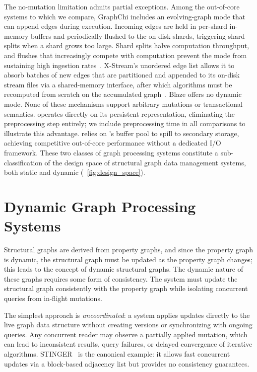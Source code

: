 The no-mutation limitation admits partial exceptions.
Among the out-of-core systems to which we compare, GraphChi includes an evolving-graph mode that can append edges during execution.
Incoming edges are held in per-shard in-memory buffers and periodically flushed to the on-disk shards, triggering shard splits when a shard grows too large.
Shard splits halve computation throughput, and flushes that increasingly compete with computation prevent the mode from sustaining high ingestion rates~\cite{kyrola2012graphchi}.
X-Stream's unordered edge list allows it to absorb batches of new edges that are partitioned and appended to its on-disk stream files via a shared-memory interface, after which algorithms must be recomputed from scratch on the accumulated graph~\cite{roy2013x}.
Blaze offers no dynamic mode.
None of these mechanisms support arbitrary mutations or transactional semantics.
\project{} operates directly on its persistent representation, eliminating the preprocessing step entirely; we include preprocessing time in all comparisons to illustrate this advantage.
\project{} relies on \wt{}'s buffer pool to spill to secondary storage, achieving competitive out-of-core performance without a dedicated I/O framework.
These two classes of graph processing systems constitute a sub-classification of the design space of structural graph data management systems, both static and dynamic (~\autoref{fig:design_space}).

\section{Dynamic Graph Processing Systems}
\label{design:dynamic_structural}
Structural graphs are derived from property graphs, and since the property graph is dynamic, the structural graph must be updated as the property graph changes; this leads to the concept of dynamic structural graphs.
The dynamic nature of these graphs requires some form of consistency.
The system must update the structural graph consistently with the property graph while isolating concurrent queries from in-flight mutations.

The simplest approach is \emph{uncoordinated}: a system applies updates directly to the live graph data structure without creating versions or synchronizing with ongoing queries.
Any concurrent reader may observe a partially applied mutation, which can lead to inconsistent results, query failures, or delayed convergence of iterative algorithms.
STINGER~\cite{stinger2012ediger} is the canonical example: it allows fast concurrent updates via a block-based adjacency list but provides no consistency guarantees.


